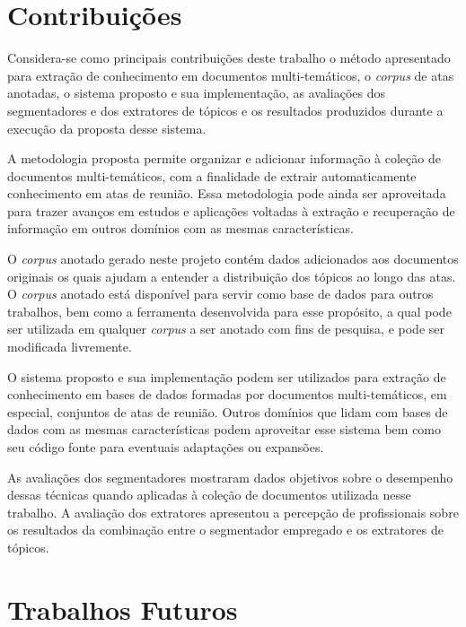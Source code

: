 \section{Contribuições}	



Considera-se como principais contribuições deste trabalho o método apresentado para extração de conhecimento em documentos multi-temáticos, o \textit{corpus} de atas anotadas, o sistema proposto e sua implementação, as avaliações dos segmentadores e dos extratores de tópicos e os resultados produzidos durante a execução da proposta desse sistema. 

A metodologia proposta permite organizar e adicionar informação à coleção de documentos multi-temáticos, com a finalidade de extrair automaticamente conhecimento em atas de reunião. Essa metodologia pode ainda ser  aproveitada para trazer avanços em estudos e aplicações voltadas à extração e recuperação de informação em outros domínios com as mesmas características. 

O \textit{corpus} anotado gerado neste projeto contém dados adicionados aos documentos originais os quais ajudam a entender a distribuição dos tópicos ao longo das atas. O \textit{corpus} anotado está disponível para servir como base de dados para outros trabalhos, bem como a ferramenta desenvolvida para esse propósito, a qual pode ser utilizada em qualquer \textit{corpus} a ser anotado com fins de pesquisa, e pode ser modificada livremente. 

O sistema proposto e sua implementação podem ser utilizados para extração de conhecimento em bases de dados formadas por documentos multi-temáticos, em especial, conjuntos de atas de reunião. Outros domínios que lidam com bases de dados com as mesmas características podem aproveitar esse sistema bem como seu código fonte para eventuais adaptações ou expansões.
 
As avaliações dos segmentadores mostraram dados objetivos sobre o desempenho dessas técnicas quando aplicadas à coleção de documentos utilizada nesse trabalho. 
A avaliação dos extratores apresentou a percepção de profissionais sobre os resultados da combinação entre o segmentador empregado e os extratores de tópicos.







\section{Trabalhos Futuros}	

